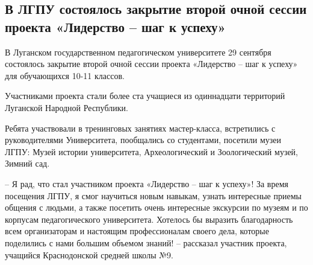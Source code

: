  
 
 
 
 
\subsection{В ЛГПУ состоялось закрытие второй очной сессии проекта «Лидерство – шаг к успеху»}
\label{sec:29_09_2021.stz.edu.lnr.lgpu.2.liderstvo_shag_k_uspehu}


В Луганском государственном педагогическом университете 29 сентября состоялось
закрытие второй очной сессии проекта «Лидерство – шаг к успеху» для обучающихся
10-11 классов.


Участниками проекта стали более ста учащиеся из одиннадцати территорий
Луганской Народной Республики.


Ребята участвовали в тренинговых занятиях мастер-класса, встретились с
руководителями Университета, пообщались со студентами, посетили  музеи ЛГПУ:
Музей истории университета, Археологический и Зоологический музей, Зимний сад.


\begin{zznagolos}
– Я рад, что стал участником проекта «Лидерство – шаг к успеху»! За время
посещения ЛГПУ, я смог научиться новым навыкам, узнать интересные приемы
общения с людьми, а также посетить очень интересные экскурсии по музеям и по
корпусам педагогического университета. Хотелось бы выразить благодарность всем
организаторам и настоящим профессионалам своего дела, которые поделились с нами
большим объемом знаний! – рассказал участник проекта, учащийся Краснодонской
средней школы №9.
\end{zznagolos}

